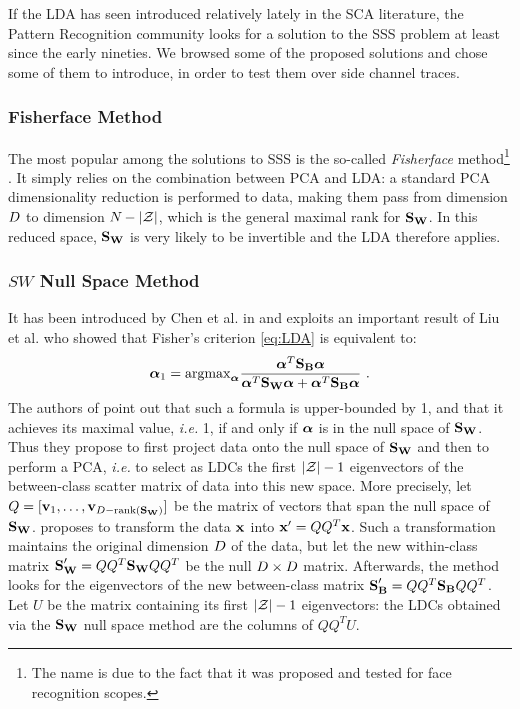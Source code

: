 If the LDA has seen introduced relatively lately in the SCA literature, the Pattern Recognition community looks for a solution to the SSS problem at least since the early nineties. We browsed some of the proposed solutions and chose some of them to introduce, in order to test them over side channel traces.

\subsubsection{Fisherface Method}
The most popular among the solutions to SSS is the so-called {\em Fisherface} method\footnote{The name is due to the fact that it was proposed and tested for face recognition scopes.} \cite{eigenfaces}. It simply relies on the combination between PCA and LDA: a standard PCA dimensionality reduction is performed to data, making them pass from dimension $\traceLength$ to dimension $\numTraces[]-\lvert \sensVarSet \rvert$, which is the general maximal rank for $\SW$. In this reduced space, $\SW$ is very likely to be invertible and the LDA therefore applies.

\subsubsection{$SW$ Null Space Method}
It has been introduced by Chen et al. in \cite{Chen2000} and exploits an important result of Liu et al. \cite{liu1992generalized} who showed that Fisher's criterion \eqref{eq:LDA} is equivalent to:
 \begin{equation}
 \AAlpha_1=\mathrm{argmax}_{\AAlpha} \frac{\AAlpha^T \SB \AAlpha}{\AAlpha^T \SW \AAlpha + \AAlpha^T \SB \AAlpha} \mbox{ .}
 \end{equation}
The authors of \cite{Chen2000} point out that such a formula is upper-bounded by 1, and that it achieves its maximal value, \textit{i.e.} 1, if and only if  $\AAlpha$ is in the null space of $\SW$. Thus they propose to first project data onto the null space of $\SW$ and then to perform a PCA, \textit{i.e.} to select as LDCs the first $\lvert \sensVarSet \rvert - 1$ eigenvectors of the between-class scatter matrix of data into this new space. More precisely, let $Q = [\vvv_1, \dots, \vvv_{\traceLength - \mathrm{rank}(\SW)}]$ be the matrix of vectors that span the null space of $\SW$. \cite{Chen2000} proposes to transform the data $\sss[]{}$ into $\xxx' = QQ^T\xxx$. Such a transformation maintains the original dimension $\traceLength$ of the data, but let the new within-class matrix $\SW' = QQ^T\SW QQ^T$ be the null $\traceLength \times \traceLength$ matrix. Afterwards, the method looks for the eigenvectors of the new between-class matrix $\SB' = QQ^T\SB QQ^T$. Let $U$ be the matrix containing its first $\lvert \sensVarSet \rvert - 1$ eigenvectors: the LDCs obtained via the $\SW$ null space method are the columns of $QQ^TU$.

